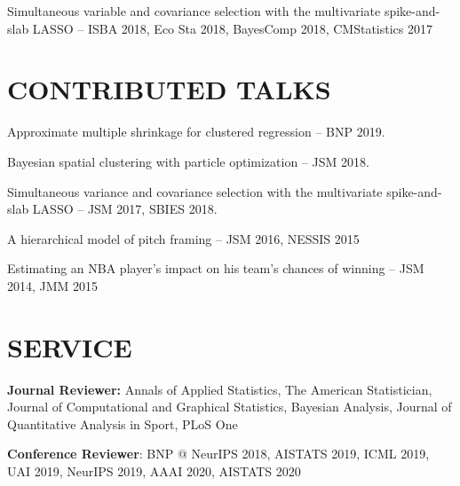 \documentclass[margin]{res}
\begin{document}
\begin{resume}



Simultaneous variable and covariance selection with the multivariate spike-and-slab LASSO -- ISBA 2018, Eco Sta 2018, BayesComp 2018, CMStatistics 2017




\section{CONTRIBUTED \hspace{0.1in} TALKS}

Approximate multiple shrinkage for clustered regression -- BNP 2019.

Bayesian spatial clustering with particle optimization -- JSM 2018. 

Simultaneous variance and covariance selection with the multivariate spike-and-slab LASSO -- JSM 2017, SBIES 2018.

A hierarchical model of pitch framing -- JSM 2016, NESSIS 2015


Estimating an NBA player's impact on his team's chances of winning -- JSM 2014, JMM 2015





\section{SERVICE}
\textbf{Journal Reviewer:} Annals of Applied Statistics, The American Statistician, Journal of Computational and Graphical Statistics, Bayesian Analysis, Journal of Quantitative Analysis in Sport, PLoS One

\textbf{Conference Reviewer}: BNP @ NeurIPS 2018, AISTATS 2019, ICML 2019, UAI 2019, NeurIPS 2019, AAAI 2020, AISTATS 2020



\end{resume} 
\end{document}

